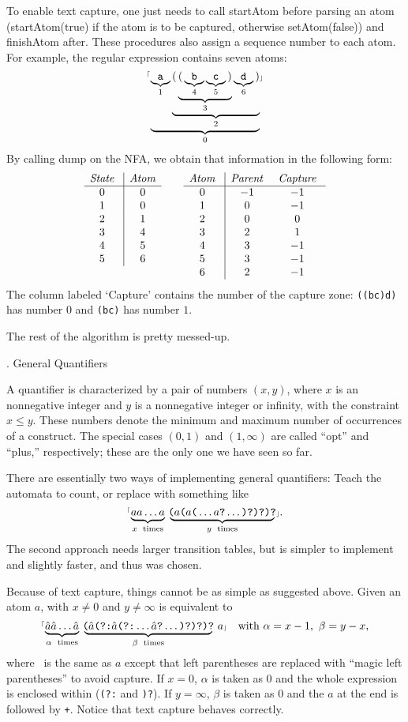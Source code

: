 To enable text capture, one just needs to call {\sf startAtom} before parsing an atom ({\sf startAtom(true)} if the atom is to be captured, otherwise {\sf setAtom(false)}) and {\sf finishAtom} after.  These procedures also assign a sequence number to each atom.  For example, the regular expression  contains seven atoms:  $$\hbox{{$^{\scriptscriptstyle\lceil}$\tt$\underbrace{\underbrace{\tt a}_1\underbrace{{\tt (}\underbrace{{\tt (}\underbrace{\tt b}_4\underbrace{\tt c}_5{\tt )}}_3\underbrace{\tt d}_6{\tt )}}_2}_0$$\scriptscriptstyle\rfloor$}}$$  By calling {\sf dump} on the NFA, we obtain that information in the following form: $$\vtop{\halign{\g{$#$} \vrule & \g{$#$}\cr
  {\it State\/} & {\it Atom\/} \cr
\noalign{\hrule}
  0             & 0 \cr
  1             & 0 \cr
  2             & 1 \cr
  3             & 4 \cr
  4             & 5 \cr
  5             & 6 \cr
}}\qquad\vtop{\halign{\g{$#$} \vrule && \g{$#$} \cr
  {\it Atom\/} & {\it Parent\/} & {\it Capture\/} \cr
\noalign{\hrule}
  0            &  -1            & -1 \cr
  1            &  0             & -1 \cr
  2            &  0             &  0 \cr
  3            &  2             &  1 \cr
  4            &  3             & -1 \cr
  5            &  3             & -1 \cr
  6            &  2             & -1 \cr
}}$$  The column labeled `Capture' contains the number of the capture zone:  {\tt ((bc)d)} has number $0$ and {\tt (bc)} has number $1$.

The rest of the algorithm is pretty messed-up.

. General Quantifiers

A quantifier is characterized by a pair of numbers $(x, y)$, where $x$ is an nonnegative integer and $y$ is a nonnegative integer or infinity, with the constraint $x \le y$.  These numbers denote the minimum and maximum number of occurrences of a construct.  The special cases $(0, 1)$ and $(1, \infty)$ are called ``opt'' and ``plus,'' respectively; these are the only one we have seen so far.

There are essentially two ways of implementing general quantifiers:  Teach the automata to count, or replace  with something like $$\hbox{\rx{$\underbrace{\hbox{$aa$}\ldots\hbox{$a$\vphantom)}}_{x\rm\ times}\,\,\underbrace{\!\hbox{($a$($a$(}\ldots\hbox{$a$?}\ldots\hbox{)?)?)?}\!}_{y\rm\ times}\,$}.}$$  The second approach needs larger transition tables, but is simpler to implement and slightly faster, and thus was chosen.

Because of text capture, things cannot be as simple as suggested above.  Given an atom $a$,  with $x \ne 0$ and $y \ne \infty$ is equivalent to $$\hbox{\rx{$\underbrace{\hbox{\haha\haha}\ldots\hbox{\haha\vphantom)}}_{\alpha\rm\ times}\,\,\underbrace{\!\hbox{(\haha(?:\haha(?:}\ldots\hbox{\haha?}\ldots\hbox{)?)?)?}\!}_{\beta\rm\ times}\,\,a$}} \quad \hbox{with}\ \alpha = x - 1,\ \beta = y - x,$$ where \haha~is the same as $a$ except that left parentheses are replaced with ``magic left parentheses'' to avoid capture.  If $x = 0$, $\alpha$ is taken as 0 and the whole expression is enclosed within ({\tt (?:} and {\tt )?}).  If $y = \infty$, $\beta$ is taken as 0 and the $a$ at the end is followed by {\tt +}.  Notice that text capture behaves correctly.

